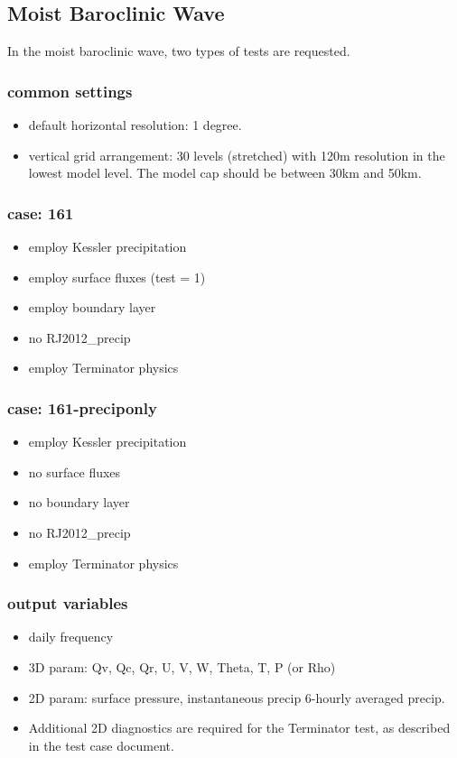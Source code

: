 \documentclass[a4paper]{article}
\begin{document}
\subsection{Moist Baroclinic Wave}
In the moist baroclinic wave, two types of tests are requested.

\subsubsection{common settings}
 \begin{itemize}
   \item default horizontal resolution: 1 degree.
   \item vertical grid arrangement: 30 levels (stretched)
   with 120m resolution in the lowest model level.
   The model cap should be between 30km and 50km.
 \end{itemize}

\subsubsection{case: 161}
 \begin{itemize}
   \item employ Kessler precipitation
   \item employ surface fluxes (test = 1)
   \item employ boundary layer
   \item no RJ2012\_precip
   \item employ Terminator physics
 \end{itemize}

\subsubsection{case: 161-preciponly}
 \begin{itemize}
   \item employ Kessler precipitation
   \item no surface fluxes
   \item no boundary layer
   \item no RJ2012\_precip
   \item employ Terminator physics
 \end{itemize}

\subsubsection{output variables}
 \begin{itemize}
   \item daily frequency
   \item 3D param: Qv, Qc, Qr, U, V, W, Theta, T, P (or Rho)
   \item 2D param: surface pressure, instantaneous precip 6-hourly averaged precip.
   \item Additional 2D diagnostics are required for the Terminator test,
         as described in the test case document.
 \end{itemize}
\end{document}
